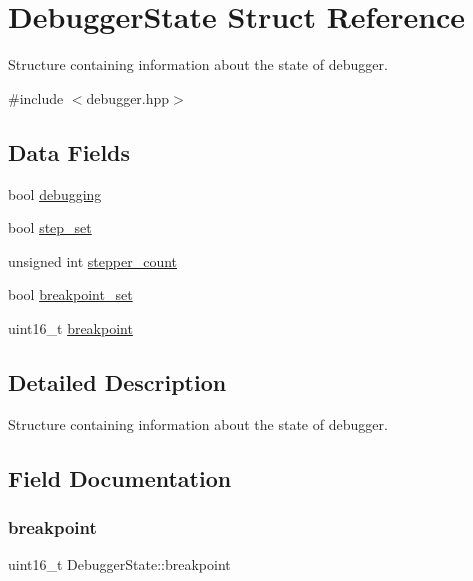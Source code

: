 \hypertarget{structDebuggerState}{}\section{Debugger\+State Struct Reference}
\label{structDebuggerState}


Structure containing information about the state of debugger.  




{\ttfamily \#include $<$debugger.\+hpp$>$}

\subsection*{Data Fields}
\begin{DoxyCompactItemize}
\item 
bool \mbox{\hyperlink{structDebuggerState_a20cdc00f0d9054c48f13fb0312df8884}{debugging}}
\item 
bool \mbox{\hyperlink{structDebuggerState_a6639effd05e4732748f00d028147b78f}{step\+\_\+set}}
\item 
unsigned int \mbox{\hyperlink{structDebuggerState_a382993246ed27b0778d3069af4868aa5}{stepper\+\_\+count}}
\item 
bool \mbox{\hyperlink{structDebuggerState_a4eeabf35f3cb6144f156a477402b3c5e}{breakpoint\+\_\+set}}
\item 
uint16\+\_\+t \mbox{\hyperlink{structDebuggerState_a529202548c7619bed9e4e5bd32bb5ce8}{breakpoint}}
\end{DoxyCompactItemize}


\subsection{Detailed Description}
Structure containing information about the state of debugger. 

\subsection{Field Documentation}
\mbox{\label{structDebuggerState_a529202548c7619bed9e4e5bd32bb5ce8}} 
\subsubsection{\texorpdfstring{breakpoint}{breakpoint}}
{\footnotesize\ttfamily uint16\+\_\+t Debugger\+State\+::breakpoint}

